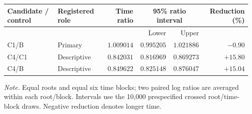 \begingroup
\fontsize{8.7}{10.5}\selectfont
\setlength{\tabcolsep}{3.0pt}\renewcommand{\arraystretch}{1.03}
\noindent
\begin{tabularx}{\linewidth}{@{}>{\raggedright\arraybackslash}Xlrrrr@{}}
\toprule
Candidate / control & Registered role & Time ratio & \multicolumn{2}{c}{95\% ratio interval} & Reduction (\%)\\
\cmidrule(lr){4-5}
 &  &  & Lower & Upper & \\
\midrule
C1/B & Primary & $1.009014$ & $0.995205$ & $1.021886$ & $-0.90$\\
\midrule
C4/C1 & Descriptive & $0.842031$ & $0.816969$ & $0.869273$ & $+15.80$\\
C4/B & Descriptive & $0.849622$ & $0.825148$ & $0.876047$ & $+15.04$\\
\bottomrule
\end{tabularx}
\par\smallskip
\fontsize{8}{9.6}\selectfont\raggedright
\textit{Note.} Equal roots and equal six time blocks; two paired log ratios are averaged within each root/block. Intervals use the 10,000 prespecified crossed root/time-block draws. Negative reduction denotes longer time.
\par\endgroup
